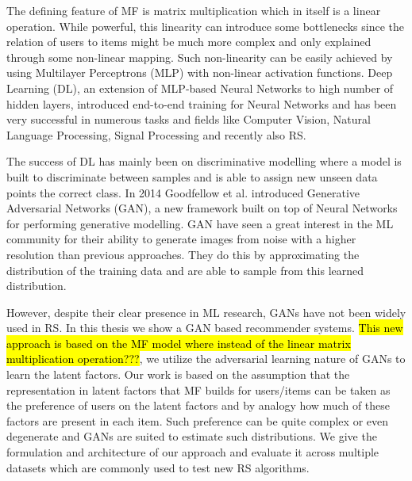 The defining feature of MF is matrix multiplication which in itself is a linear operation. While powerful, this linearity can introduce some bottlenecks since the relation of users to items might be much more complex and only explained through some non-linear mapping. Such non-linearity can be easily achieved by using Multilayer Perceptrons (MLP) with non-linear activation functions. Deep Learning (DL), an extension of MLP-based Neural Networks to high number of hidden layers, introduced end-to-end training for Neural Networks and has been very successful in numerous tasks and fields like Computer Vision, Natural Language Processing, Signal Processing and recently also RS.

The success of DL has mainly been on discriminative modelling where a model is built to discriminate between samples and is able to assign new unseen data points the correct class. In 2014 Goodfellow et al. introduced Generative Adversarial Networks (GAN), a new framework built on top of Neural Networks for performing generative modelling. GAN have seen a great interest in the ML community for their ability to generate images from noise with a higher resolution than previous approaches. They do this by approximating the distribution of the training data and are able to sample from this learned distribution.

However, despite their clear presence in ML research, GANs have not been widely used in RS. In this thesis we show a GAN based recommender systems. \hl{This new approach is based on the MF model where instead of the linear matrix multiplication operation???}, we utilize the adversarial learning nature of GANs to learn the latent factors. Our work is based on the assumption that the representation in latent factors that MF builds for users/items can be taken as the preference of users on the latent factors and by analogy how much of these factors are present in each item. Such preference can be quite complex or even degenerate and GANs are suited to estimate such distributions. We give the formulation and architecture of our approach and evaluate it across multiple datasets which are commonly used to test new RS algorithms.